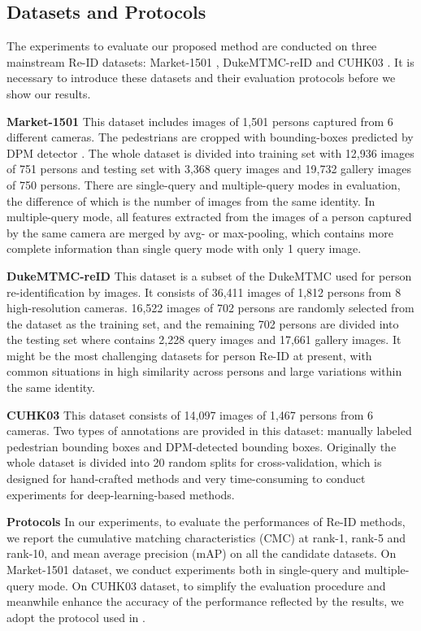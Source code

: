 \documentclass[sigconf]{acmart}
\begin{document}
\subsection{Datasets and Protocols}
The experiments to evaluate our proposed method are conducted on three mainstream Re-ID datasets: Market-1501 \cite{zheng2015scalable}, DukeMTMC-reID \cite{zheng2017unlabeled} and CUHK03 \cite{li2014deepreid}. It is necessary to introduce these datasets and their evaluation protocols before we show our results.

\textbf{Market-1501} This dataset includes images of 1,501 persons captured from 6 different cameras. The pedestrians are cropped with bounding-boxes predicted by DPM detector \cite{felzenszwalb2008discriminatively}. The whole dataset is divided into training set with 12,936 images of 751 persons and testing set with 3,368 query images and 19,732 gallery images of 750 persons. There are single-query and multiple-query modes in evaluation, the difference of which is the number of images from the same identity. In multiple-query mode, all features extracted from the images of a person captured by the same camera are merged by avg- or max-pooling, which contains more complete information than single query mode with only 1 query image. 

\textbf{DukeMTMC-reID} This dataset is a subset of the DukeMTMC \cite{ristani2016MTMC} used for person re-identification by images. It consists of 36,411 images of 1,812 persons from 8 high-resolution cameras. 16,522 images of 702 persons are randomly selected from the dataset as the training set, and the remaining 702 persons are divided into the testing set where contains 2,228 query images and 17,661 gallery images. It might be the most challenging datasets for person Re-ID at present, with common situations in high similarity across persons and large variations within the same identity.

\textbf{CUHK03} This dataset consists of 14,097 images of 1,467 persons from 6 cameras. Two types of annotations are provided in this dataset: manually labeled pedestrian bounding boxes and DPM-detected bounding boxes. Originally the whole dataset is divided into 20 random splits for cross-validation, which is designed for hand-crafted methods and very time-consuming to conduct experiments for deep-learning-based methods. 

\textbf{Protocols} In our experiments, to evaluate the performances of Re-ID methods, we report the cumulative matching characteristics (CMC) at rank-1, rank-5 and rank-10, and mean average precision (mAP) on all the candidate datasets. On Market-1501 dataset, we conduct experiments both in single-query and multiple-query mode. On CUHK03 dataset, to simplify the evaluation procedure and meanwhile enhance the accuracy of the performance reflected by the results, we adopt the protocol used in \cite{zhong2017rerank}. 
\end{document}
